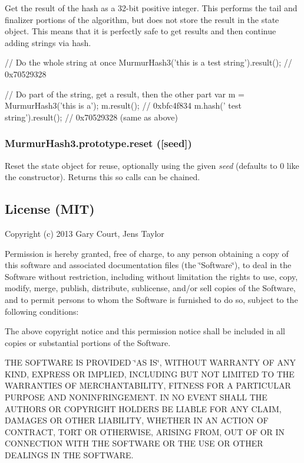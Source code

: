 Get the result of the hash as a 32-\/bit positive integer. This performs the tail and finalizer portions of the algorithm, but does not store the result in the state object. This means that it is perfectly safe to get results and then continue adding strings via {\ttfamily hash}.


\begin{DoxyCode}
// Do the whole string at once
MurmurHash3('this is a test string').result();
// 0x70529328

// Do part of the string, get a result, then the other part
var m = MurmurHash3('this is a');
m.result();
// 0xbfc4f834
m.hash(' test string').result();
// 0x70529328 (same as above)
\end{DoxyCode}
 



\subsubsection*{Murmur\+Hash3.\+prototype.\+reset (\mbox{[}seed\mbox{]})}

Reset the state object for reuse, optionally using the given {\itshape seed} (defaults to 0 like the constructor). Returns {\ttfamily this} so calls can be chained. 



\subsection*{License (M\+IT) }

Copyright (c) 2013 Gary Court, Jens Taylor

Permission is hereby granted, free of charge, to any person obtaining a copy of this software and associated documentation files (the \char`\"{}\+Software\char`\"{}), to deal in the Software without restriction, including without limitation the rights to use, copy, modify, merge, publish, distribute, sublicense, and/or sell copies of the Software, and to permit persons to whom the Software is furnished to do so, subject to the following conditions\+:

The above copyright notice and this permission notice shall be included in all copies or substantial portions of the Software.

T\+HE S\+O\+F\+T\+W\+A\+RE IS P\+R\+O\+V\+I\+D\+ED \char`\"{}\+A\+S I\+S\char`\"{}, W\+I\+T\+H\+O\+UT W\+A\+R\+R\+A\+N\+TY OF A\+NY K\+I\+ND, E\+X\+P\+R\+E\+SS OR I\+M\+P\+L\+I\+ED, I\+N\+C\+L\+U\+D\+I\+NG B\+UT N\+OT L\+I\+M\+I\+T\+ED TO T\+HE W\+A\+R\+R\+A\+N\+T\+I\+ES OF M\+E\+R\+C\+H\+A\+N\+T\+A\+B\+I\+L\+I\+TY, F\+I\+T\+N\+E\+SS F\+OR A P\+A\+R\+T\+I\+C\+U\+L\+AR P\+U\+R\+P\+O\+SE A\+ND N\+O\+N\+I\+N\+F\+R\+I\+N\+G\+E\+M\+E\+NT. IN NO E\+V\+E\+NT S\+H\+A\+LL T\+HE A\+U\+T\+H\+O\+RS OR C\+O\+P\+Y\+R\+I\+G\+HT H\+O\+L\+D\+E\+RS BE L\+I\+A\+B\+LE F\+OR A\+NY C\+L\+A\+IM, D\+A\+M\+A\+G\+ES OR O\+T\+H\+ER L\+I\+A\+B\+I\+L\+I\+TY, W\+H\+E\+T\+H\+ER IN AN A\+C\+T\+I\+ON OF C\+O\+N\+T\+R\+A\+CT, T\+O\+RT OR O\+T\+H\+E\+R\+W\+I\+SE, A\+R\+I\+S\+I\+NG F\+R\+OM, O\+UT OF OR IN C\+O\+N\+N\+E\+C\+T\+I\+ON W\+I\+TH T\+HE S\+O\+F\+T\+W\+A\+RE OR T\+HE U\+SE OR O\+T\+H\+ER D\+E\+A\+L\+I\+N\+GS IN T\+HE S\+O\+F\+T\+W\+A\+RE. 